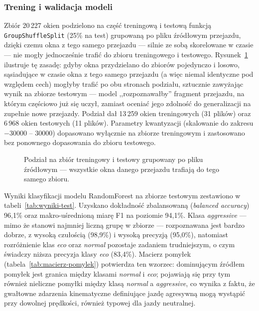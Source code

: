 \subsubsection{Trening i walidacja modeli}

Zbiór 20\,227 okien podzielono na część treningową i testową funkcją
\texttt{GroupShuffleSplit} (25\% na test) grupowaną po pliku źródłowym
przejazdu, dzięki czemu okna z tego samego przejazdu --- silnie ze sobą
skorelowane w czasie --- nie mogły jednocześnie trafić do zbioru treningowego
i testowego. Rysunek~\ref{fig:podzial-grupowany} ilustruje tę zasadę: gdyby
okna przydzielano do zbiorów pojedynczo i losowo, sąsiadujące w czasie okna
z tego samego przejazdu (a więc niemal identyczne pod względem cech) mogłyby
trafić po obu stronach podziału, sztucznie zawyżając wynik na zbiorze
testowym --- model \mbox{,,rozpoznawałby''} fragment przejazdu, na którym
częściowo już się uczył, zamiast oceniać jego zdolność do generalizacji na
zupełnie nowe przejazdy. Podział dał 13\,259 okien treningowych (31 plików) oraz
6\,968 okien testowych (11 plików). Parametry kwantyzacji (skalowanie do
zakresu $-30000$ -- $30000$) dopasowano wyłącznie na zbiorze treningowym
i zastosowano bez ponownego dopasowania do zbioru testowego.

\begin{figure}[!h]
    \centering
    \resizebox{\linewidth}{!}{}
    \caption{Podział na zbiór treningowy i testowy grupowany po pliku źródłowym --- wszystkie okna danego przejazdu trafiają do tego samego zbioru.}
    \label{fig:podzial-grupowany}
\end{figure}

Wyniki klasyfikacji modelu RandomForest na zbiorze testowym zestawiono
w tabeli~\ref{tab:wyniki-test}. Uzyskano dokładność zbalansowaną
(\emph{balanced accuracy}) 96,1\% oraz makro-uśrednioną miarę F1 na
poziomie 94,1\%. Klasa \emph{aggressive} --- mimo że stanowi najmniej liczną
grupę w zbiorze --- rozpoznawana jest bardzo dobrze, z wysoką czułością
(98,9\%) i wysoką precyzją (95,0\%), natomiast rozróżnienie klas \emph{eco}
oraz \emph{normal} pozostaje zadaniem trudniejszym, o czym świadczy niższa
precyzja klasy \emph{eco} (83,4\%). Macierz pomyłek (tabela~\ref{tab:macierz-pomylek})
potwierdza ten wzorzec: dominującym źródłem pomyłek jest granica między
klasami \emph{normal} i \emph{eco}; pojawiają się przy tym również nieliczne
pomyłki między klasą \emph{normal} a \emph{aggressive}, co wynika z faktu, że
gwałtowne zdarzenia kinematyczne definiujące jazdę agresywną mogą wystąpić
przy dowolnej prędkości, również typowej dla jazdy neutralnej.

